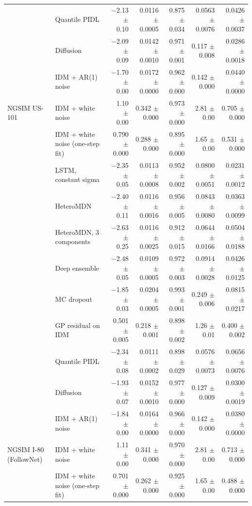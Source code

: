 \begin{longtable}{llrrrrr}
 & Quantile PIDL & $-$2.13 $\pm$ 0.10 & 0.0116 $\pm$ 0.0005 & 0.875 $\pm$ 0.034 & 0.0563 $\pm$ 0.0076 & 0.0426 $\pm$ 0.0037 \\
 & Diffusion & $-$2.09 $\pm$ 0.09 & 0.0142 $\pm$ 0.0010 & 0.971 $\pm$ 0.001 & 0.117 $\pm$ 0.008 & 0.0286 $\pm$ 0.0018 \\
 & IDM + AR(1) noise & $-$1.70 $\pm$ 0.00 & 0.0172 $\pm$ 0.0000 & 0.962 $\pm$ 0.000 & 0.142 $\pm$ 0.000 & 0.0440 $\pm$ 0.0000 \\
\midrule
NGSIM US-101 & IDM + white noise & 1.10 $\pm$ 0.00 & 0.342 $\pm$ 0.000 & 0.973 $\pm$ 0.000 & 2.81 $\pm$ 0.00 & 0.705 $\pm$ 0.000 \\
 & IDM + white noise (one-step fit) & 0.790 $\pm$ 0.000 & 0.288 $\pm$ 0.000 & 0.895 $\pm$ 0.000 & 1.65 $\pm$ 0.00 & 0.531 $\pm$ 0.000 \\
 & LSTM, constant sigma & $-$2.35 $\pm$ 0.05 & 0.0113 $\pm$ 0.0008 & 0.952 $\pm$ 0.002 & 0.0800 $\pm$ 0.0051 & 0.0231 $\pm$ 0.0012 \\
 & HeteroMDN & $-$2.40 $\pm$ 0.11 & 0.0116 $\pm$ 0.0016 & 0.956 $\pm$ 0.005 & 0.0843 $\pm$ 0.0080 & 0.0363 $\pm$ 0.0099 \\
 & HeteroMDN, 3 components & $-$2.63 $\pm$ 0.25 & 0.0116 $\pm$ 0.0025 & 0.912 $\pm$ 0.015 & 0.0644 $\pm$ 0.0166 & 0.0504 $\pm$ 0.0188 \\
 & Deep ensemble & $-$2.48 $\pm$ 0.05 & 0.0109 $\pm$ 0.0005 & 0.972 $\pm$ 0.003 & 0.0914 $\pm$ 0.0028 & 0.0426 $\pm$ 0.0125 \\
 & MC dropout & $-$1.85 $\pm$ 0.03 & 0.0204 $\pm$ 0.0005 & 0.993 $\pm$ 0.001 & 0.249 $\pm$ 0.006 & 0.0815 $\pm$ 0.0217 \\
 & GP residual on IDM & 0.501 $\pm$ 0.005 & 0.218 $\pm$ 0.001 & 0.898 $\pm$ 0.002 & 1.26 $\pm$ 0.01 & 0.400 $\pm$ 0.002 \\
 & Quantile PIDL & $-$2.34 $\pm$ 0.08 & 0.0111 $\pm$ 0.0002 & 0.898 $\pm$ 0.029 & 0.0576 $\pm$ 0.0073 & 0.0656 $\pm$ 0.0076 \\
 & Diffusion & $-$1.93 $\pm$ 0.07 & 0.0152 $\pm$ 0.0010 & 0.977 $\pm$ 0.000 & 0.127 $\pm$ 0.009 & 0.0300 $\pm$ 0.0019 \\
 & IDM + AR(1) noise & $-$1.84 $\pm$ 0.00 & 0.0164 $\pm$ 0.0000 & 0.966 $\pm$ 0.000 & 0.142 $\pm$ 0.000 & 0.0380 $\pm$ 0.0000 \\
\midrule
NGSIM I-80 (FollowNet) & IDM + white noise & 1.11 $\pm$ 0.00 & 0.341 $\pm$ 0.000 & 0.970 $\pm$ 0.000 & 2.81 $\pm$ 0.00 & 0.713 $\pm$ 0.000 \\
 & IDM + white noise (one-step fit) & 0.701 $\pm$ 0.000 & 0.262 $\pm$ 0.000 & 0.925 $\pm$ 0.000 & 1.65 $\pm$ 0.00 & 0.488 $\pm$ 0.000 \\

\end{longtable}
